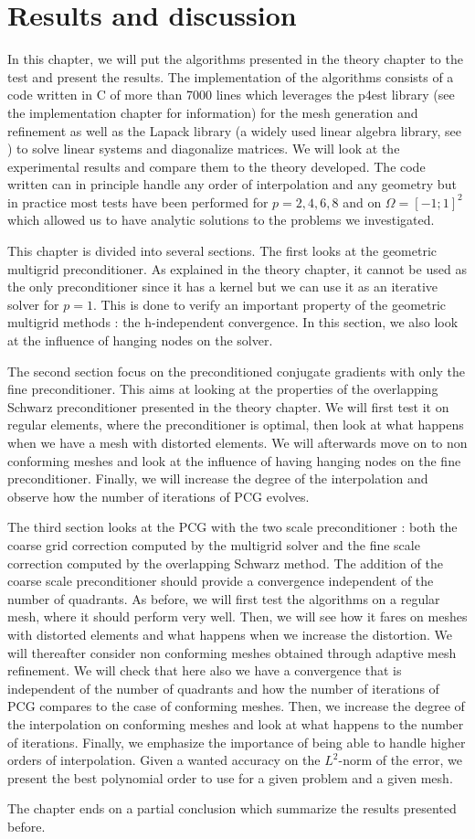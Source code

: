 \chapter{Results and discussion}
In this chapter, we will put the algorithms presented in the theory chapter to the test and present the results. The implementation of the algorithms consists of a code written in C of more than 7000 lines which leverages the p4est library (see the implementation chapter for information) for the mesh generation and refinement as well as the Lapack library (a widely used linear algebra library, see \cite{lapack}) to solve linear systems and diagonalize matrices. We will look at the experimental results and compare them to the theory developed. The code written can in principle handle any order of interpolation and any geometry but in practice most tests have been performed for $p=2,4,6,8$ and on $\Omega = [-1;1]^2$ which allowed us to have analytic solutions to the problems we investigated. 

This chapter is divided into several sections. The first looks at the geometric multigrid preconditioner. As explained in the theory chapter, it cannot be used as the only preconditioner since it has a kernel but we can use it as an iterative solver for $p=1$. This is done to verify an important property of the geometric multigrid methods : the h-independent convergence. In this section, we also look at the influence of hanging nodes on the solver.

The second section focus on the preconditioned conjugate gradients with only the fine preconditioner. This aims at looking at the properties of the overlapping Schwarz preconditioner presented in the theory chapter. We will first test it on regular elements, where the preconditioner is optimal, then look at what happens when we have a mesh with distorted elements. We will afterwards move on to non conforming meshes and look at the influence of having hanging nodes on the fine preconditioner. Finally, we will increase the degree of the interpolation and observe how the number of iterations of PCG evolves. 

The third section looks at the PCG with the two scale preconditioner : both the coarse grid correction computed by the multigrid solver and the fine scale correction computed by the overlapping Schwarz method. The addition of the coarse scale preconditioner should provide a convergence independent of the number of quadrants. As before, we will first test the algorithms on a regular mesh, where it should perform very well. Then, we will see how it fares on meshes with distorted elements and what happens when we increase the distortion. We will thereafter consider non conforming meshes obtained through adaptive mesh refinement. We will check that here also we have a convergence that is independent of the number of quadrants and how the number of iterations of PCG compares to the case of conforming meshes. Then, we increase the degree of the interpolation on conforming meshes and look at what happens to the number of iterations. Finally, we emphasize the importance of being able to handle higher orders of interpolation. Given a wanted accuracy on the $L^2$-norm of the error, we present the best polynomial order to use for a given problem and a given mesh. 

The chapter ends on a partial conclusion which summarize the results presented before.

  